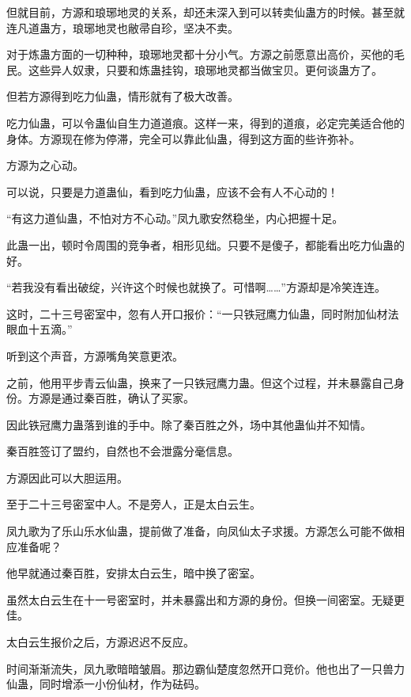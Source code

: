 
\begin{this_body}

但就目前，方源和琅琊地灵的关系，却还未深入到可以转卖仙蛊方的时候。甚至就连凡道蛊方，琅琊地灵也敝帚自珍，坚决不卖。

对于炼蛊方面的一切种种，琅琊地灵都十分小气。方源之前愿意出高价，买他的毛民。这些异人奴隶，只要和炼蛊挂钩，琅琊地灵都当做宝贝。更何谈蛊方了。

但若方源得到吃力仙蛊，情形就有了极大改善。

吃力仙蛊，可以令蛊仙自生力道道痕。这样一来，得到的道痕，必定完美适合他的身体。方源现在修为停滞，完全可以靠此仙蛊，得到这方面的些许弥补。

方源为之心动。

可以说，只要是力道蛊仙，看到吃力仙蛊，应该不会有人不心动的！

“有这力道仙蛊，不怕对方不心动。”凤九歌安然稳坐，内心把握十足。

此蛊一出，顿时令周围的竞争者，相形见绌。只要不是傻子，都能看出吃力仙蛊的好。

“若我没有看出破绽，兴许这个时候也就换了。可惜啊……”方源却是冷笑连连。

这时，二十三号密室中，忽有人开口报价：“一只铁冠鹰力仙蛊，同时附加仙材法眼血十五滴。”

听到这个声音，方源嘴角笑意更浓。

之前，他用平步青云仙蛊，换来了一只铁冠鹰力蛊。但这个过程，并未暴露自己身份。方源是通过秦百胜，确认了买家。

因此铁冠鹰力蛊落到谁的手中。除了秦百胜之外，场中其他蛊仙并不知情。

秦百胜签订了盟约，自然也不会泄露分毫信息。

方源因此可以大胆运用。

至于二十三号密室中人。不是旁人，正是太白云生。

凤九歌为了乐山乐水仙蛊，提前做了准备，向凤仙太子求援。方源怎么可能不做相应准备呢？

他早就通过秦百胜，安排太白云生，暗中换了密室。

虽然太白云生在十一号密室时，并未暴露出和方源的身份。但换一间密室。无疑更佳。

太白云生报价之后，方源迟迟不反应。

时间渐渐流失，凤九歌暗暗皱眉。那边霸仙楚度忽然开口竞价。他也出了一只兽力仙蛊，同时增添一小份仙材，作为砝码。


\end{this_body}

